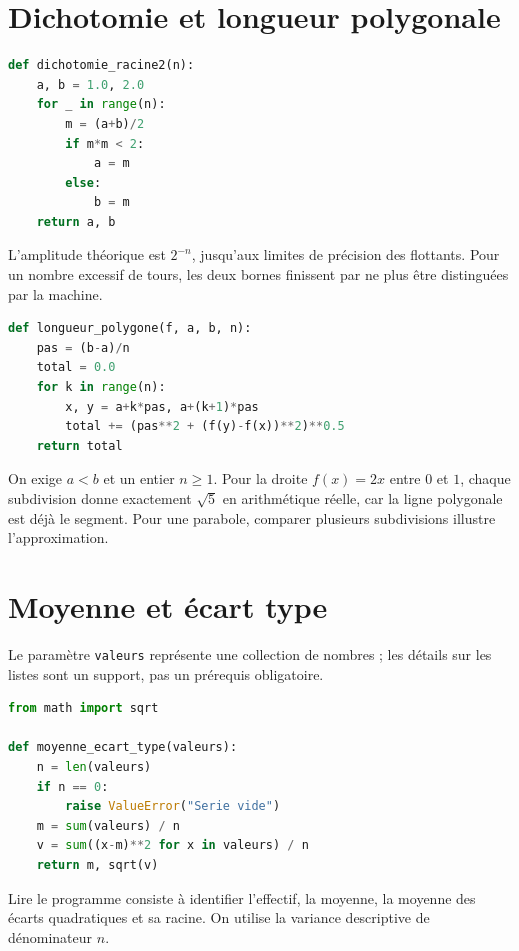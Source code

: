 \documentclass[../cours_2de.tex]{subfiles}
\begin{document}
\section{Dichotomie et longueur polygonale}
\begin{lstlisting}[language=Python]
def dichotomie_racine2(n):
    a, b = 1.0, 2.0
    for _ in range(n):
        m = (a+b)/2
        if m*m < 2:
            a = m
        else:
            b = m
    return a, b
\end{lstlisting}
L'amplitude théorique est $2^{-n}$, jusqu'aux limites de précision des flottants. Pour un nombre excessif de tours, les deux bornes finissent par ne plus être distinguées par la machine.
\begin{lstlisting}[language=Python]
def longueur_polygone(f, a, b, n):
    pas = (b-a)/n
    total = 0.0
    for k in range(n):
        x, y = a+k*pas, a+(k+1)*pas
        total += (pas**2 + (f(y)-f(x))**2)**0.5
    return total
\end{lstlisting}
On exige $a<b$ et un entier $n\geq1$.
Pour la droite $f(x)=2x$ entre $0$ et $1$, chaque subdivision donne exactement $\sqrt5$ en arithmétique réelle, car la ligne polygonale est déjà le segment. Pour une parabole, comparer plusieurs subdivisions illustre l'approximation.
\section{Moyenne et écart type}
Le paramètre \texttt{valeurs} représente une collection de nombres ; les détails sur les listes sont un support, pas un prérequis obligatoire.
\begin{lstlisting}[language=Python]
from math import sqrt

def moyenne_ecart_type(valeurs):
    n = len(valeurs)
    if n == 0:
        raise ValueError("Serie vide")
    m = sum(valeurs) / n
    v = sum((x-m)**2 for x in valeurs) / n
    return m, sqrt(v)
\end{lstlisting}
Lire le programme consiste à identifier l'effectif, la moyenne, la moyenne des écarts quadratiques et sa racine. On utilise la variance descriptive de dénominateur $n$.
\end{document}
